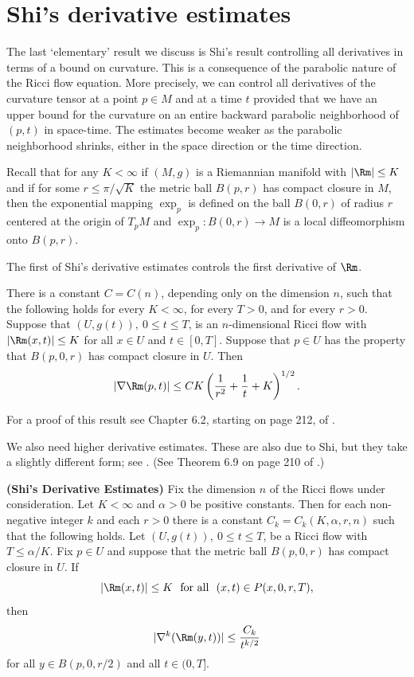 \section{Shi's derivative estimates}

The last `elementary' result we discuss is Shi's result controlling all derivatives in terms of a
bound on curvature. This is a consequence of the parabolic nature of
the Ricci flow equation. More precisely, we can control all
derivatives of the curvature tensor at a point $p\in M$ and at a
time $t$ provided that we have an upper bound for the curvature on
an entire backward parabolic neighborhood of $(p,t)$ in space-time.
The estimates become weaker as the parabolic neighborhood shrinks,
either in the space direction or the time direction.

Recall that for any $K<\infty$  if $(M,g)$ is a Riemannian manifold
with $|\Rm|\le K$ and if for some $r\le \pi/\sqrt{K}$ the metric ball
$B(p,r)$ has compact closure in $M$, then the exponential mapping
$\exp_p$ is defined on the ball $B(0,r)$ of radius $r$ centered
at the origin of $T_pM$ and $\exp_p\colon B(0,r)\to M$ is a
local diffeomorphism onto $B(p,r)$.


The first of Shi's derivative estimates controls the first
derivative of $\Rm$.

\begin{theorem}\label{thm:shi-first-derivative}
\label{firstshi}

There is a constant $C=C(n)$, depending only on the dimension $n$,
such that the following holds for every $K<\infty$, for every $T>0$,
and for every $r>0$. Suppose that $(U,g(t)),\ 0\le t\le T$, is an $n$-dimensional
Ricci flow with $|\Rm(x,t)|\le K$ for all $x\in U$ and $t\in [0,T]$.
Suppose that $p\in U$ has the property that $B(p,0,r)$ has compact
closure in $U$. Then
$$|\nabla \Rm(p,t)|\le
CK\left(\frac{1}{r^2}+\frac{1}{t}+K\right)^{1/2}.$$
\end{theorem}


For a proof of this result see Chapter 6.2, starting on page 212, of
\cite{ChowLuNi}.

We also need higher derivative estimates. These are also due to Shi,
but they take a slightly different form; see \cite{Shi1,Shi2}. (See Theorem 6.9 on page
210 of \cite{ChowLuNi}.)


\begin{theorem}\label{thm:shi-derivative-estimates}
\label{shi}

{\bf (Shi's Derivative Estimates)} Fix the dimension $n$ of the Ricci flows under consideration. Let
$K<\infty$ and $\alpha>0$ be positive constants.  Then for each
non-negative integer $k$ and each $r>0$ there is a constant
$C_k=C_k(K,\alpha,r,n)$ such that the following holds. Let
$(U,g(t)),\ 0\le t\le T$, be a Ricci flow with $T\le \alpha/K$.
Fix $p\in U$ and suppose that the metric ball $B(p,0,r)$ has compact
closure in $U$. If
$$|\Rm(x,t)|\le K\ \ \text{for all }\ (x,t)\in P(x,0,r,T),$$
then
$$|\nabla^k(\Rm(y,t))|\le \frac{C_k}{t^{k/2}}$$
for all $y\in B(p,0,r/2)$ and all $t\in(0,T]$.
\end{theorem}

